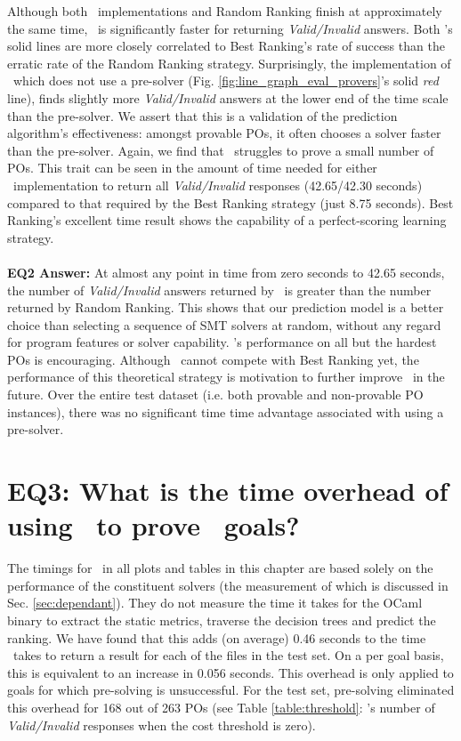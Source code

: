 Although both \where~implementations and \textsf{Random Ranking} finish at approximately the same time, \where~is significantly faster for returning \textit{Valid/Invalid} answers. 
Both \where's solid lines are more closely correlated to \textsf{Best Ranking}'s rate of success than the erratic rate of the \textsf{Random Ranking} strategy.
Surprisingly, the implementation of \where~which does not use a pre-solver (Fig. \ref{fig:line_graph_eval_provers}'s solid \textit{red} line), finds slightly more \textit{Valid/Invalid} answers  at the lower end of the time scale than the pre-solver.  
We assert that this is a validation of the prediction algorithm's effectiveness: amongst provable POs, it often chooses a solver faster than the pre-solver.
Again, we find that \where~struggles to prove a small number of POs.
This trait can be seen in the amount of time needed for either \where~implementation to return all \textit{Valid/Invalid} responses (42.65/42.30 seconds) compared to that required by the \textsf{Best Ranking} strategy (just 8.75 seconds). 
\textsf{Best Ranking}'s excellent time result shows the capability of a perfect-scoring learning strategy. \\
\\
\textbf{EQ2 Answer:} At almost any point in time from zero seconds to 42.65 seconds, the number of \textit{Valid/Invalid} answers returned by \where~is greater than the number returned by \textsf{Random Ranking}.
This shows that our prediction model is a better choice than selecting a sequence of SMT solvers at random, without any regard for program features or solver capability.
\where's performance on all but the hardest POs is encouraging.
Although \where~cannot compete with \textsf{Best Ranking} yet, the performance of this theoretical strategy is motivation to further improve \where~in the future.
Over the entire test dataset (i.e. both provable and non-provable PO instances), there was no significant time time advantage associated with using a pre-solver.   



\section{EQ3: What is the time overhead of using \where~to prove \why~goals?}

\label{sec:eq3}

The timings for \where~in all plots and tables in this chapter are based solely on the performance of the constituent solvers (the measurement of which is discussed in Sec. \ref{sec:dependant}). They do not measure the time it takes for the OCaml binary to extract the static metrics, traverse the decision trees and predict the ranking. 
We have found that this adds (on average) 0.46 seconds to the time \where~takes to return a result for each of the files in the test set. 
On a per goal basis, this is equivalent to an increase in 0.056 seconds.
This overhead is only applied to goals for which pre-solving is unsuccessful.  
For the test set, pre-solving eliminated this overhead for 168 out of 263 POs (see Table \ref{table:threshold}: \where's number of \textit{Valid/Invalid} responses when the cost threshold is zero).

